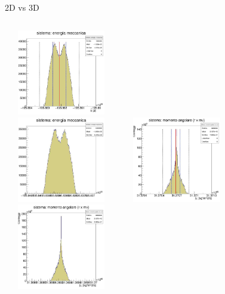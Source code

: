 \documentclass[Serif, 10pt, brown]{beamer}
\theoremstyle{example}
\theoremstyle{plain}
\begin{document}
    \begin{frame}{2D vs 3D}
        \begin{columns}
                \centering
                \includegraphics[width=5cm,height=3.75cm]{E2D.jpg}\\
                \includegraphics[width=5cm,height=3.75cm]{4_energia/E_500_3600.jpg}
                \label{cfr::E4T}              
                \centering        
                \includegraphics[width=5cm,height=3.75cm]{L2D.jpg}\\
                \includegraphics[width=5cm,height=3.75cm]{3_Momento/L_500_3600.jpg}
                \label{cfr::E6T}      
        \end{columns}
    \end{frame}

    
    
    
    
\end{document}
